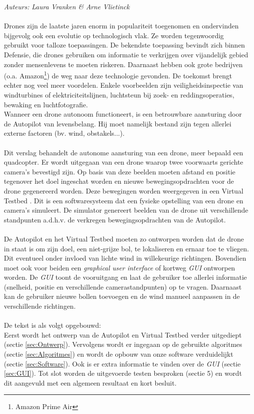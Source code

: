 {\em Auteurs: Laura Vranken \& Arne Vlietinck}
\\\\
\noindent
Drones zijn de laatste jaren enorm in populariteit toegenomen en ondervinden bijgevolg ook een evolutie op technologisch vlak. Ze worden tegenwoordig gebruikt voor talloze toepassingen. De bekendste toepassing bevindt zich binnen Defensie, die drones gebruiken om informatie te verkrijgen over vijandelijk gebied zonder mensenlevens te moeten riskeren. Daarnaast hebben ook grote bedrijven (o.a. Amazon\footnote{Amazon Prime Air}) de weg naar deze technologie gevonden. De toekomst brengt echter nog veel meer voordelen. Enkele voorbeelden  \cite{website:microdrones} zijn veiligheidsinspectie van windturbines of elektriciteitslijnen, luchtsteun bij zoek- en reddingsoperaties, bewaking en luchtfotografie.
\\
Wanneer een drone autonoom functioneert, is een betrouwbare aansturing door de Autopilot van levensbelang. Hij moet namelijk bestand zijn tegen allerlei externe factoren (bv. wind, obstakels...).
\\
\\
Dit verslag behandelt de autonome aansturing van een drone, meer bepaald een quadcopter. Er wordt uitgegaan van een drone waarop twee voorwaarts gerichte camera's bevestigd zijn. Op basis van deze beelden moeten afstand en positie tegenover het doel ingeschat worden en nieuwe bewegingsopdrachten voor de drone gegenereerd worden. Deze bewegingen worden weergegeven in een Virtual Testbed \cite{arcticle:opgavePeno}. Dit is een softwaresysteem dat een fysieke opstelling van een drone en camera's simuleert. De simulator genereert beelden van de drone uit verschillende standpunten a.d.h.v. de verkregen bewegingsopdrachten van de Autopilot. 
\\
\\
De Autopilot en het Virtual Testbed moeten zo ontworpen worden dat de drone in staat is om zijn doel, een niet-grijze bol, te lokaliseren en ernaar toe te vliegen. Dit eventueel onder invloed van lichte wind in willekeurige richtingen. Bovendien moet ook voor beiden een \textit{graphical user interface} of kortweg \textit{GUI} ontworpen worden. De \textit{GUI} toont de vooruitgang en laat de gebruiker toe allerlei informatie (snelheid, positie en verschillende camerastandpunten) op te vragen. Daarnaast kan de gebruiker nieuwe bollen toevoegen en de wind manueel aanpassen in de verschillende richtingen. 
\\
\\
De tekst is als volgt opgebouwd:\\
 Eerst wordt het ontwerp van de Autopilot en Virtual Testbed verder uitgediept (sectie \ref{sec:Ontwerp}). Vervolgens wordt er ingegaan op de gebruikte algoritmes (sectie \ref{sec:Algoritmes}) en wordt de opbouw van onze software verduidelijkt (sectie \ref{sec:Software}). Ook is er extra informatie te vinden over de \textit{GUI} (sectie \ref{sec:GUI}). Tot slot worden de uitgevoerde testen besproken (sectie 5) en wordt dit aangevuld met een algemeen resultaat en kort besluit.